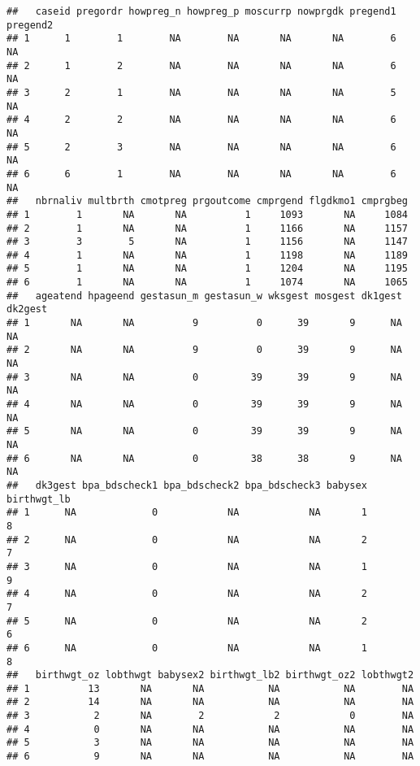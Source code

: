 \documentclass[]{article}
\begin{document}
\begin{verbatim}
##   caseid pregordr howpreg_n howpreg_p moscurrp nowprgdk pregend1 pregend2
## 1      1        1        NA        NA       NA       NA        6       NA
## 2      1        2        NA        NA       NA       NA        6       NA
## 3      2        1        NA        NA       NA       NA        5       NA
## 4      2        2        NA        NA       NA       NA        6       NA
## 5      2        3        NA        NA       NA       NA        6       NA
## 6      6        1        NA        NA       NA       NA        6       NA
##   nbrnaliv multbrth cmotpreg prgoutcome cmprgend flgdkmo1 cmprgbeg
## 1        1       NA       NA          1     1093       NA     1084
## 2        1       NA       NA          1     1166       NA     1157
## 3        3        5       NA          1     1156       NA     1147
## 4        1       NA       NA          1     1198       NA     1189
## 5        1       NA       NA          1     1204       NA     1195
## 6        1       NA       NA          1     1074       NA     1065
##   ageatend hpageend gestasun_m gestasun_w wksgest mosgest dk1gest dk2gest
## 1       NA       NA          9          0      39       9      NA      NA
## 2       NA       NA          9          0      39       9      NA      NA
## 3       NA       NA          0         39      39       9      NA      NA
## 4       NA       NA          0         39      39       9      NA      NA
## 5       NA       NA          0         39      39       9      NA      NA
## 6       NA       NA          0         38      38       9      NA      NA
##   dk3gest bpa_bdscheck1 bpa_bdscheck2 bpa_bdscheck3 babysex birthwgt_lb
## 1      NA             0            NA            NA       1           8
## 2      NA             0            NA            NA       2           7
## 3      NA             0            NA            NA       1           9
## 4      NA             0            NA            NA       2           7
## 5      NA             0            NA            NA       2           6
## 6      NA             0            NA            NA       1           8
##   birthwgt_oz lobthwgt babysex2 birthwgt_lb2 birthwgt_oz2 lobthwgt2
## 1          13       NA       NA           NA           NA        NA
## 2          14       NA       NA           NA           NA        NA
## 3           2       NA        2            2            0        NA
## 4           0       NA       NA           NA           NA        NA
## 5           3       NA       NA           NA           NA        NA
## 6           9       NA       NA           NA           NA        NA

\end{verbatim}
\end{document}
